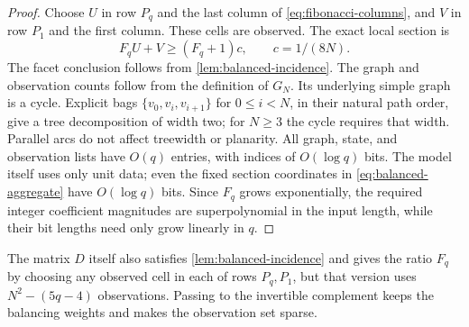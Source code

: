 \begin{proof}
Choose $U$ in row $P_q$ and the last column of
\eqref{eq:fibonacci-columns}, and $V$ in row $P_1$ and the first
column. These cells are observed. The exact local section is
\begin{equation}\label{eq:fibonacci-edge}
 F_q U+V\ge(F_q+1)c,\qquad c=1/(8N).
\end{equation}
The facet conclusion follows from \cref{lem:balanced-incidence}.
The graph and observation counts follow from the definition of $G_N$.
Its underlying simple graph is a cycle. Explicit bags
$\{v_0,v_i,v_{i+1}\}$ for $0\le i<N$, in their natural path order,
give a tree decomposition of width two; for $N\ge3$ the cycle
requires that width. Parallel arcs do not affect treewidth or planarity.
All graph, state, and observation lists have $O(q)$ entries, with
indices of $O(\log q)$ bits. The model itself uses only unit data;
even the fixed section coordinates in \eqref{eq:balanced-aggregate}
have $O(\log q)$ bits. Since $F_q$ grows exponentially, the
required integer coefficient magnitudes are superpolynomial in the
input length, while their bit lengths need only grow linearly in $q$.
\end{proof}

The matrix $D$ itself also satisfies \cref{lem:balanced-incidence}
and gives the ratio $F_q$ by choosing any observed cell in each of rows
$P_q,P_1$, but that version uses $N^2-(5q-4)$ observations. Passing to
the invertible complement keeps the balancing weights and makes the
observation set sparse.

